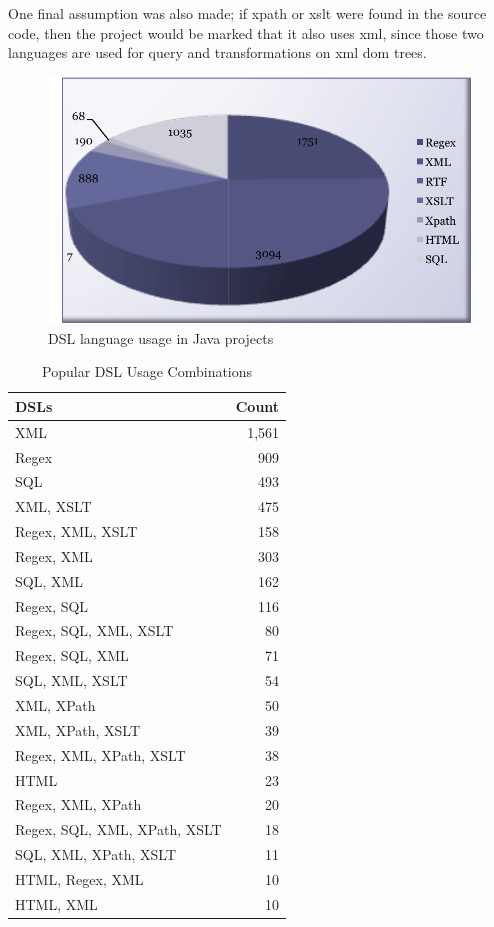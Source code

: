 \documentclass{sig-alternate}
\begin{document}
One final assumption was also made; if {\sc xpath} or {\sc xslt} were found in the source code, then the project would be marked that it also uses {\sc xml}, since those two languages are used for query and transformations on {\sc xml} {\sc dom} trees.

\begin{figure}
\centering
\includegraphics[scale=0.65]{dsl-usage}
\caption{DSL language usage in Java projects}
\label{fig:dsl-usage}
\end{figure}

\begin{table}
\centering
\caption{Popular DSL Usage Combinations}
\label{tbl:dsl-top-usage}
\begin{tabular}{l r}
 \hline
\textbf{DSLs} & \textbf{Count}\\
\hline
XML & 1,561\\
Regex & 909\\
SQL & 493\\
XML, XSLT & 475\\
Regex, XML, XSLT & 158\\
Regex, XML & 303\\
SQL, XML & 162\\
Regex, SQL & 116\\
Regex, SQL, XML, XSLT & 80\\
Regex, SQL, XML & 71\\
SQL, XML, XSLT & 54\\
XML, XPath & 50\\
XML, XPath, XSLT & 39\\
Regex, XML, XPath, XSLT & 38\\
HTML & 23\\
Regex, XML, XPath & 20\\
Regex, SQL, XML, XPath, XSLT & 18\\
SQL, XML, XPath, XSLT & 11\\
HTML, Regex, XML & 10\\
HTML, XML & 10\\
\hline
\end{tabular}
\end{table}
\end{document}
